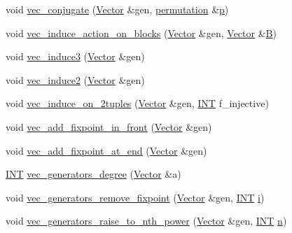 \begin{DoxyCompactItemize}
\item 
void \mbox{\hyperlink{perm__group__gens_8_c_a394633eb67f30ca43fc9aff8abfff329}{vec\+\_\+conjugate}} (\mbox{\hyperlink{class_vector}{Vector}} \&gen, \mbox{\hyperlink{classpermutation}{permutation}} \&\mbox{\hyperlink{alphabet2_8_c_a533391314665d6bf1b5575e9a9cd8552}{p}})
\item 
void \mbox{\hyperlink{perm__group__gens_8_c_abd8d371d1cb9f8c4c9cd730a9f1d899d}{vec\+\_\+induce\+\_\+action\+\_\+on\+\_\+blocks}} (\mbox{\hyperlink{class_vector}{Vector}} \&gen, \mbox{\hyperlink{class_vector}{Vector}} \&\mbox{\hyperlink{costas_8_c_ad1f767566c3189fb90e9cffcc5dd4680}{B}})
\item 
void \mbox{\hyperlink{perm__group__gens_8_c_ad65b14ae1fbc7903f14e2c28c4d7294f}{vec\+\_\+induce3}} (\mbox{\hyperlink{class_vector}{Vector}} \&gen)
\item 
void \mbox{\hyperlink{perm__group__gens_8_c_ac60864f2b7c636649eca13b67280fbe1}{vec\+\_\+induce2}} (\mbox{\hyperlink{class_vector}{Vector}} \&gen)
\item 
void \mbox{\hyperlink{perm__group__gens_8_c_a19ec562c31abd023c81ef386ecbdc167}{vec\+\_\+induce\+\_\+on\+\_\+2tuples}} (\mbox{\hyperlink{class_vector}{Vector}} \&gen, \mbox{\hyperlink{galois_8h_a09fddde158a3a20bd2dcadb609de11dc}{I\+NT}} f\+\_\+injective)
\item 
void \mbox{\hyperlink{perm__group__gens_8_c_ac4dd25e0c5667e96be14b00ee2b6fc14}{vec\+\_\+add\+\_\+fixpoint\+\_\+in\+\_\+front}} (\mbox{\hyperlink{class_vector}{Vector}} \&gen)
\item 
void \mbox{\hyperlink{perm__group__gens_8_c_a0dd3a7f059eb598bd7dbd95cc557a397}{vec\+\_\+add\+\_\+fixpoint\+\_\+at\+\_\+end}} (\mbox{\hyperlink{class_vector}{Vector}} \&gen)
\item 
\mbox{\hyperlink{galois_8h_a09fddde158a3a20bd2dcadb609de11dc}{I\+NT}} \mbox{\hyperlink{perm__group__gens_8_c_a3af229f9b239b34ea1f9905b3b620e0d}{vec\+\_\+generators\+\_\+degree}} (\mbox{\hyperlink{class_vector}{Vector}} \&a)
\item 
void \mbox{\hyperlink{perm__group__gens_8_c_abd19615607abe35d6ccfc1f4d421dc2e}{vec\+\_\+generators\+\_\+remove\+\_\+fixpoint}} (\mbox{\hyperlink{class_vector}{Vector}} \&gen, \mbox{\hyperlink{galois_8h_a09fddde158a3a20bd2dcadb609de11dc}{I\+NT}} \mbox{\hyperlink{alphabet2_8_c_acb559820d9ca11295b4500f179ef6392}{i}})
\item 
void \mbox{\hyperlink{perm__group__gens_8_c_ae2abdba2094e87b7f58ee9042738b4f5}{vec\+\_\+generators\+\_\+raise\+\_\+to\+\_\+nth\+\_\+power}} (\mbox{\hyperlink{class_vector}{Vector}} \&gen, \mbox{\hyperlink{galois_8h_a09fddde158a3a20bd2dcadb609de11dc}{I\+NT}} \mbox{\hyperlink{simeon_8_c_a7f2cd26777ce0ff3fdaf8d02aacbddfb}{n}})

\end{DoxyCompactItemize}
